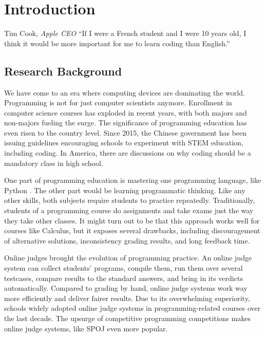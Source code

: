
\chapter{Introduction}
\label{chap:intro}

\begin{chapquote}{Tim Cook, \textit{Apple CEO}}
    ``If I were a French student and I were 10 years old,
    I think it would be more important for me to learn coding than English.''
\end{chapquote}

\section{Research Background}

    We have come to an era where computing devices are dominating the world.
    Programming is not for just computer scientists anymore.
    Enrollment in computer science courses has exploded in recent years,
    with both majors and non-majors fueling the surge.
    The significance of programming education has even risen to the country level.
    Since 2015, the Chinese government has been issuing guidelines encouraging schools
    to experiment with STEM education, including coding. \cite{gov_2015,gov_2017}
    In America, there are discussions on why coding should be a mandatory class in high school.
    \cite{tim_bajrin_why_2014}

    One part of programming education is mastering one programming language, like Python \cite{python.org}.
    The other part would be learning programmatic thinking.
    Like any other skills, both subjects require students to practice repeatedly.
    Traditionally, students of a programming course do assignments and take exams
    just the way they take other classes.
    It might turn out to be that this approach works well for courses like Calculus,
    but it exposes several drawbacks, including discouragement of alternative solutions,
    inconsistency grading results, and long feedback time.

    Online judges brought the evolution of programming practice.
    An online judge system can collect students' programs, compile them,
    run them over several testcases, compare results to the standard answers,
    and bring in its verdicts automatically.
    Compared to grading by hand, online judge systems work way more efficiently and deliver fairer results.
    Due to its overwhelming superiority,
    schools widely adopted online judge systems in programming-related courses over the last decade.
    \cite{Li2005,luo2008programming}
    The upsurge of competitive programming competitions makes online judge systems,
    like SPOJ \cite{kosowski2007application} even more popular.

